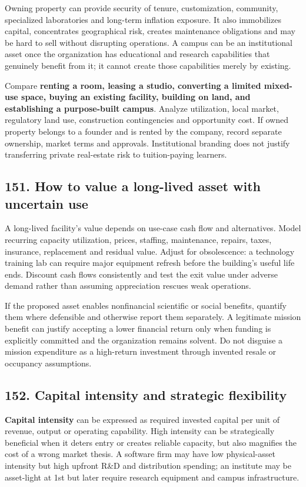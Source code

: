 Owning property can provide security of tenure, customization, community, specialized laboratories and long-term inflation exposure. It also immobilizes capital, concentrates geographical risk, creates maintenance obligations and may be hard to sell without disrupting operations. A campus can be an institutional asset once the organization has educational and research capabilities that genuinely benefit from it; it cannot create those capabilities merely by existing.

Compare \textbf{renting a room, leasing a studio, converting a limited mixed-use space, buying an existing facility, building on land, and establishing a purpose-built campus}. Analyze utilization, local market, regulatory land use, construction contingencies and opportunity cost. If owned property belongs to a founder and is rented by the company, record separate ownership, market terms and approvals. Institutional branding does not justify transferring private real-estate risk to tuition-paying learners.

\subsection{151. How to value a long-lived asset with uncertain use}


A long-lived facility's value depends on use-case cash flow and alternatives. Model recurring capacity utilization, prices, staffing, maintenance, repairs, taxes, insurance, replacement and residual value. Adjust for obsolescence: a technology training lab can require major equipment refresh before the building's useful life ends. Discount cash flows consistently and test the exit value under adverse demand rather than assuming appreciation rescues weak operations.

If the proposed asset enables nonfinancial scientific or social benefits, quantify them where defensible and otherwise report them separately. A legitimate mission benefit can justify accepting a lower financial return only when funding is explicitly committed and the organization remains solvent. Do not disguise a mission expenditure as a high-return investment through invented resale or occupancy assumptions.

\subsection{152. Capital intensity and strategic flexibility}


\textbf{Capital intensity} can be expressed as required invested capital per unit of revenue, output or operating capability. High intensity can be strategically beneficial when it deters entry or creates reliable capacity, but also magnifies the cost of a wrong market thesis. A software firm may have low physical-asset intensity but high upfront R\&D and distribution spending; an institute may be asset-light at 1st but later require research equipment and campus infrastructure.

